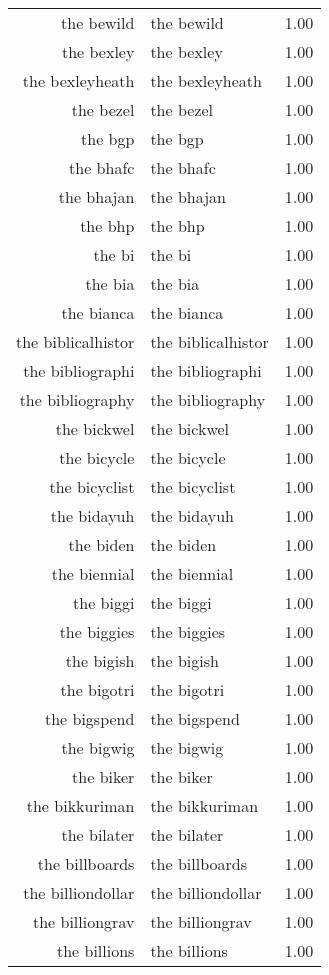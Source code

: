 \begin{table}[ht]
\begin{tabular}{rlr}
  the bewild & the bewild & 1.00 \\ 
  the bexley & the bexley & 1.00 \\ 
  the bexleyheath & the bexleyheath & 1.00 \\ 
  the bezel & the bezel & 1.00 \\ 
  the bgp & the bgp & 1.00 \\ 
  the bhafc & the bhafc & 1.00 \\ 
  the bhajan & the bhajan & 1.00 \\ 
  the bhp & the bhp & 1.00 \\ 
  the bi & the bi & 1.00 \\ 
  the bia & the bia & 1.00 \\ 
  the bianca & the bianca & 1.00 \\ 
  the biblicalhistor & the biblicalhistor & 1.00 \\ 
  the bibliographi & the bibliographi & 1.00 \\ 
  the bibliography & the bibliography & 1.00 \\ 
  the bickwel & the bickwel & 1.00 \\ 
  the bicycle & the bicycle & 1.00 \\ 
  the bicyclist & the bicyclist & 1.00 \\ 
  the bidayuh & the bidayuh & 1.00 \\ 
  the biden & the biden & 1.00 \\ 
  the biennial & the biennial & 1.00 \\ 
  the biggi & the biggi & 1.00 \\ 
  the biggies & the biggies & 1.00 \\ 
  the bigish & the bigish & 1.00 \\ 
  the bigotri & the bigotri & 1.00 \\ 
  the bigspend & the bigspend & 1.00 \\ 
  the bigwig & the bigwig & 1.00 \\ 
  the biker & the biker & 1.00 \\ 
  the bikkuriman & the bikkuriman & 1.00 \\ 
  the bilater & the bilater & 1.00 \\ 
  the billboards & the billboards & 1.00 \\ 
  the billiondollar & the billiondollar & 1.00 \\ 
  the billiongrav & the billiongrav & 1.00 \\ 
  the billions & the billions & 1.00 \\ 

\end{tabular}
\end{table}
